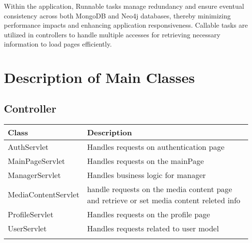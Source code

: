 Within the application, Runnable tasks manage redundancy and ensure eventual consistency across both MongoDB and 
Neo4j databases, thereby minimizing performance impacts and enhancing application responsiveness. Callable tasks 
are utilized in controllers to handle multiple accesses for retrieving necessary information to load pages efficiently.

\newpage

\section{Description of Main Classes}

\subsection*{Controller}
\renewcommand{\arraystretch}{1.5}
\begin{longtable}{|>{\arraybackslash}p{0.3\linewidth}|>{\arraybackslash}p{0.73\linewidth}|}
    \cline{1-2}
    \textbf{Class} & \textbf{Description} \\
    \cline{1-2}
    AuthServlet & Handles requests on authentication page \\
    \cline{1-2}
    MainPageServlet & Handles requests on the mainPage \\
    \cline{1-2}
    ManagerServlet & Handles business logic for manager \\    
    \cline{1-2}
    MediaContentServlet & handle requests on the media content page and retrieve or set media content releted info \\
    \cline{1-2}
    ProfileServlet & Handles requests on the profile page \\
    \cline{1-2}
    UserServlet & Handles requests related to user model \\
    \cline{1-2}
\end{longtable}

